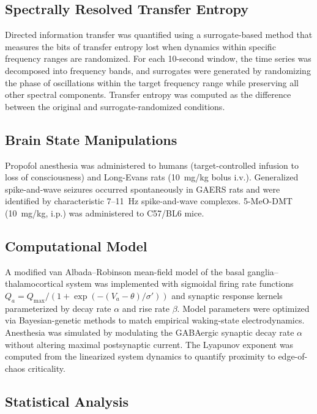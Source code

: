 \documentclass[11pt]{article}
\begin{document}
\subsection{Spectrally Resolved Transfer Entropy}

Directed information transfer was quantified using a surrogate-based method that measures the bits of transfer entropy lost when dynamics within specific frequency ranges are randomized. For each 10-second window, the time series was decomposed into frequency bands, and surrogates were generated by randomizing the phase of oscillations within the target frequency range while preserving all other spectral components. Transfer entropy was computed as the difference between the original and surrogate-randomized conditions.

\subsection{Brain State Manipulations}

Propofol anesthesia was administered to humans (target-controlled infusion to loss of consciousness) and Long-Evans rats (10~mg/kg bolus i.v.). Generalized spike-and-wave seizures occurred spontaneously in GAERS rats and were identified by characteristic 7--11~Hz spike-and-wave complexes. 5-MeO-DMT (10~mg/kg, i.p.) was administered to C57/BL6 mice.

\subsection{Computational Model}

A modified van Albada--Robinson mean-field model of the basal ganglia--thalamocortical system was implemented with sigmoidal firing rate functions $Q_a = Q_{\max} / (1 + \exp(-(V_a - \theta)/\sigma'))$ and synaptic response kernels parameterized by decay rate $\alpha$ and rise rate $\beta$. Model parameters were optimized via Bayesian-genetic methods to match empirical waking-state electrodynamics. Anesthesia was simulated by modulating the GABAergic synaptic decay rate $\alpha$ without altering maximal postsynaptic current. The Lyapunov exponent was computed from the linearized system dynamics to quantify proximity to edge-of-chaos criticality.

\subsection{Statistical Analysis}
\end{document}
